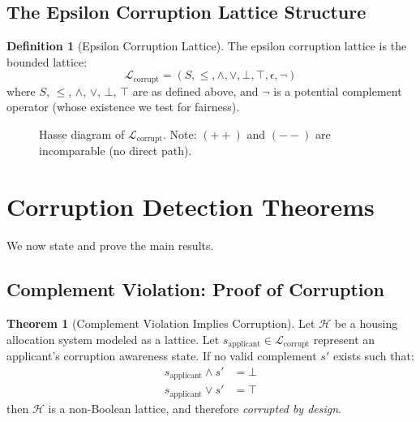 \documentclass[11pt,a4paper]{article}
\theoremstyle{definition}
\newtheorem{definition}{Definition}
\newtheorem{theorem}{Theorem}
\begin{document}
\subsection{The Epsilon Corruption Lattice Structure}

\begin{definition}[Epsilon Corruption Lattice]
The epsilon corruption lattice is the bounded lattice:
\[
\mathcal{L}_{\text{corrupt}} = (S, \leq, \wedge, \vee, \bot, \top, \epsilon, \neg)
\]
where $S$, $\leq$, $\wedge$, $\vee$, $\bot$, $\top$ are as defined above, and $\neg$ is a potential complement operator (whose existence we test for fairness).
\end{definition}

\begin{figure}[h]
\centering
{}
\caption{Hasse diagram of $\mathcal{L}_{\text{corrupt}}$. Note: $(++)$ and $(--)$ are incomparable (no direct path).}
\end{figure}

\section{Corruption Detection Theorems}

We now state and prove the main results.

\subsection{Complement Violation: Proof of Corruption}

\begin{theorem}[Complement Violation Implies Corruption]
Let $\mathcal{H}$ be a housing allocation system modeled as a lattice. Let $s_{\text{applicant}} \in \mathcal{L}_{\text{corrupt}}$ represent an applicant's corruption awareness state. If no valid complement $s'$ exists such that:
\begin{align}
s_{\text{applicant}} \wedge s' &= \bot \label{eq:comp1} \\
s_{\text{applicant}} \vee s' &= \top \label{eq:comp2}
\end{align}
then $\mathcal{H}$ is a non-Boolean lattice, and therefore \emph{corrupted by design}.
\end{theorem}
\end{document}
